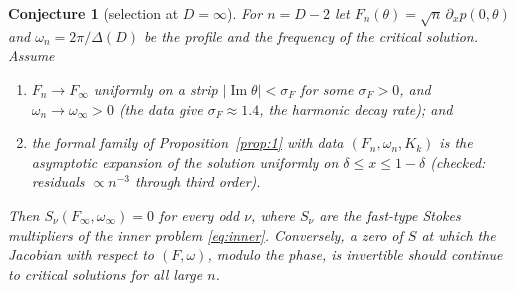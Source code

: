 \documentclass{amsart}
\numberwithin{equation}{section}
\theoremstyle{plain}
\newtheorem{conjecture}{Conjecture}
\theoremstyle{definition}
\theoremstyle{remark}
\newcommand{\winf}{\omega_\infty}
\newcommand{\im}{\operatorname{Im}}
\begin{document}
\begin{conjecture}[selection at $D = \infty$]\label{conj}
For $n = D - 2$ let $F_n(\theta) = \sqrt n\,\partial_xp(0,\theta)$ and $\omega_n = 2\pi/\Delta(D)$ be the profile and the
frequency of the critical solution. Assume
\begin{enumerate}[label=(H\arabic*),leftmargin=3em]
\item $F_n \to F_\infty$ uniformly on a strip $|\im\theta| < \sigma_F$ for some $\sigma_F > 0$, and $\omega_n \to \winf > 0$
(the data give $\sigma_F \approx 1.4$, the harmonic decay rate); and
\item the formal family of Proposition~\ref{prop:1} with data $(F_n, \omega_n, K_k)$ is the asymptotic expansion of the
solution uniformly on $\delta \le x \le 1 - \delta$ (checked: residuals $\propto n^{-3}$ through third order).
\end{enumerate}
Then $S_\nu(F_\infty, \winf) = 0$ for every odd $\nu$, where $S_\nu$ are the fast-type Stokes multipliers of the inner
problem \eqref{eq:inner}. Conversely, a zero of $S$ at which the Jacobian with respect to $(F, \omega)$, modulo the
phase, is invertible should continue to critical solutions for all large $n$.
\end{conjecture}
\end{document}
